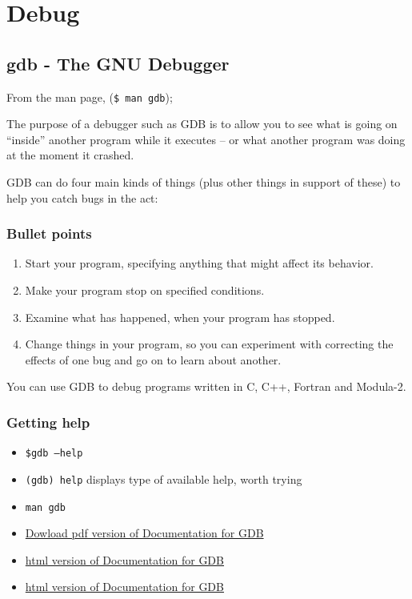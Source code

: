 \chapter{Debug}

\section{gdb - The GNU Debugger}

From the man page, (\texttt{\$ man gdb});

The purpose of a debugger such as GDB is to allow you to see what is going on ``inside'' another program while it executes -- or what another program was doing at the moment it crashed.

GDB can do four main kinds of things (plus other things in support of these) to help you catch bugs in the act:

\subsection{Bullet points}
\begin{enumerate}
  \item Start your program, specifying anything that might affect its behavior.
  \item Make your program stop on specified conditions.
  \item Examine what has happened, when your program has stopped.
  \item Change things in your program, so you can experiment with correcting the effects of one bug and go on to learn about another.
\end{enumerate}

You can use GDB to debug programs written in C, C++, Fortran and Modula-2.



\subsection{Getting help}
\begin{itemize}
  \item \texttt{\$gdb --help} \\
  \item \texttt{(gdb) help}
    displays type of available help, worth trying
  \item \texttt{man gdb}
  \item \href{https://sourceware.org/gdb/download/onlinedocs/}{Dowload pdf version of Documentation for GDB}
  \item \href{https://developer.apple.com/library/archive/documentation/DeveloperTools/gdb/gdb/gdb_toc.html}{html version of Documentation for GDB}
  \item \href{https://developer.apple.com/library/archive/documentation/DeveloperTools/gdb/gdb/gdb_toc.html}{html version of Documentation for GDB}

\end{itemize}


